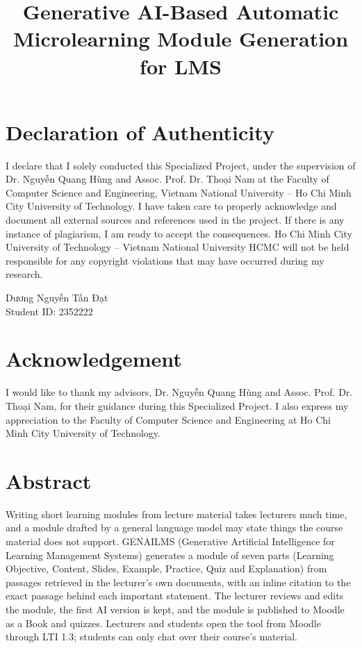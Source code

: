 \documentclass[oneside,final]{hcmut-report}
\title{Generative AI-Based Automatic Microlearning Module Generation for LMS}
\begin{document}
\hypersetup{pageanchor=false}
\coverpage
{}
\hypersetup{pageanchor=true}
\pagestyle{plain}
\thispagestyle{plain}
\section*{Declaration of Authenticity}
I declare that I solely conducted this Specialized Project, under the supervision of Dr. Nguyễn Quang Hùng and Assoc. Prof. Dr. Thoại Nam at the Faculty of Computer Science and Engineering, Vietnam National University -- Ho Chi Minh City University of Technology. I have taken care to properly acknowledge and document all external sources and references used in the project. If there is any instance of plagiarism, I am ready to accept the consequences. Ho Chi Minh City University of Technology -- Vietnam National University HCMC will not be held responsible for any copyright violations that may have occurred during my research.

\vspace{2\baselineskip}
\begin{flushright}
Dương Nguyễn Tấn Đạt\\
Student ID: 2352222
\end{flushright}
\clearpage
\thispagestyle{plain}
\section*{Acknowledgement}
I would like to thank my advisors, Dr. Nguyễn Quang Hùng and Assoc. Prof. Dr. Thoại Nam, for their guidance during this Specialized Project. I also express my appreciation to the Faculty of Computer Science and Engineering at Ho Chi Minh City University of Technology.
\clearpage
\section*{Abstract}
Writing short learning modules from lecture material takes lecturers much time, and a module drafted by a general language model may state things the course material does not support. GENAILMS (Generative Artificial Intelligence for Learning Management Systems) generates a module of seven parts (Learning Objective, Content, Slides, Example, Practice, Quiz and Explanation) from passages retrieved in the lecturer's own documents, with an inline citation to the exact passage behind each important statement. The lecturer reviews and edits the module, the first AI version is kept, and the module is published to Moodle as a Book and quizzes. Lecturers and students open the tool from Moodle through LTI 1.3; students can only chat over their course's material.
\end{document}
